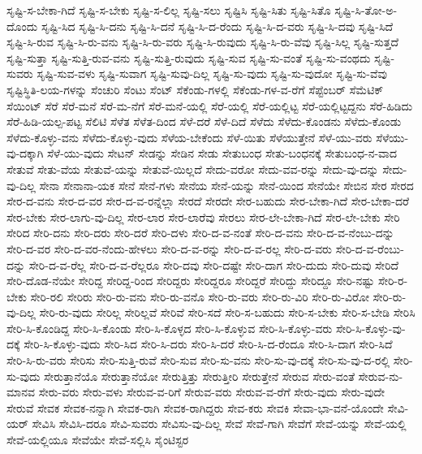 {ಸೃಷ್ಟಿ-ಸ-ಬೇಕಾ-ಗಿದೆ
ಸೃಷ್ಟಿ-ಸ-ಬೇಕು
ಸೃಷ್ಟಿ-ಸ-ಲಿಲ್ಲ
ಸೃಷ್ಟಿ-ಸಲು
ಸೃಷ್ಟಿಸಿ
ಸೃಷ್ಟಿ-ಸಿತು
ಸೃಷ್ಟಿ-ಸಿತೊ
ಸೃಷ್ಟಿ-ಸಿ-ತೋ-ಅ-ದೊಂದು
ಸೃಷ್ಟಿ-ಸಿದ
ಸೃಷ್ಟಿ-ಸಿ-ದನು
ಸೃಷ್ಟಿ-ಸಿ-ದನೆ
ಸೃಷ್ಟಿ-ಸಿ-ದ-ರೆಂದು
ಸೃಷ್ಟಿ-ಸಿ-ದ-ವರು
ಸೃಷ್ಟಿ-ಸಿ-ದವು
ಸೃಷ್ಟಿ-ಸಿದೆ
ಸೃಷ್ಟಿ-ಸಿ-ರುವ
ಸೃಷ್ಟಿ-ಸಿ-ರು-ವನು
ಸೃಷ್ಟಿ-ಸಿ-ರು-ವರು
ಸೃಷ್ಟಿ-ಸಿ-ರುವುದು
ಸೃಷ್ಟಿ-ಸಿ-ರು-ವೆವು
ಸೃಷ್ಟಿ-ಸಿಲ್ಲ
ಸೃಷ್ಟಿ-ಸುತ್ತದೆ
ಸೃಷ್ಟಿ-ಸುತ್ತಾ
ಸೃಷ್ಟಿ-ಸುತ್ತಿ-ರುವ-ವನು
ಸೃಷ್ಟಿ-ಸುತ್ತಿ-ರುವುದು
ಸೃಷ್ಟಿ-ಸುವ
ಸೃಷ್ಟಿ-ಸು-ವಂತೆ
ಸೃಷ್ಟಿ-ಸು-ವಂಥದು
ಸೃಷ್ಟಿ-ಸುವರು
ಸೃಷ್ಟಿ-ಸುವ-ವಳು
ಸೃಷ್ಟಿ-ಸುವಾಗ
ಸೃಷ್ಟಿ-ಸುವು-ದಿಲ್ಲ
ಸೃಷ್ಟಿ-ಸು-ವುದು
ಸೃಷ್ಟಿ-ಸು-ವುದೋ
ಸೃಷ್ಟಿ-ಸು-ವೆವು
ಸೃಷ್ಟಿಸ್ಥಿತಿ-ಲಯ-ಗಳನ್ನು
ಸೆಂಚುರಿ
ಸೆಂಟು
ಸೆಂಟ್
ಸೆಕೆಂಡು-ಗಳಲ್ಲಿ
ಸೆಕೆಂಡು-ಗಳ-ವ-ರೆಗೆ
ಸೆಪ್ಟೆಂಬರ್
ಸೆಮೆಟಿಕ್
ಸೆಯಿಂಟ್
ಸೆರೆ
ಸೆರೆ-ಮನೆ
ಸೆರೆ-ಮ-ನೆಗೆ
ಸೆರೆ-ಮನೆ-ಯಲ್ಲಿ
ಸೆರೆ-ಯಲ್ಲಿ
ಸೆರೆ-ಯಲ್ಲಿಟ್ಟ
ಸೆರೆ-ಯಲ್ಲಿಟ್ಟದ್ದನು
ಸೆರೆ-ಹಿಡಿದು
ಸೆರೆ-ಹಿಡಿ-ಯಲ್ಪ-ಪಟ್ಟ
ಸೆಲಿಟಿ
ಸೆಳೆತ
ಸೆಳೆತ-ದಿಂದ
ಸೆಳೆ-ದರೆ
ಸೆಳೆ-ದಿದೆ
ಸೆಳೆದು
ಸೆಳೆದು-ಕೊಂಡನು
ಸೆಳೆದು-ಕೊಂಡು
ಸೆಳೆದು-ಕೊಳ್ಳು-ವನು
ಸೆಳೆದು-ಕೊಳ್ಳು-ವುದು
ಸೆಳೆಯ-ಬೇಕೆಂದು
ಸೆಳೆ-ಯಿತು
ಸೆಳೆಯುತ್ತೇನೆ
ಸೆಳೆ-ಯು-ವರು
ಸೆಳೆಯು-ವು-ದಕ್ಕಾಗಿ
ಸೆಳೆ-ಯು-ವುದು
ಸೇಟನ್
ಸೇಡನ್ನು
ಸೇಡಿನ
ಸೇಡು
ಸೇತುಬಂಧ
ಸೇತು-ಬಂಧನಕ್ಕೆ
ಸೇತುಬಂಧ-ನ-ವಾದ
ಸೇತುವೆ
ಸೇತು-ವೆಯ
ಸೇತುವೆ-ಯನ್ನು
ಸೇತುವೆ-ಯಿಲ್ಲದೆ
ಸೇದು-ವರೋ
ಸೇದು-ವವ-ರನ್ನು
ಸೇದು-ವು-ದನ್ನು
ಸೇದು-ವು-ದಿಲ್ಲ
ಸೇನಾ
ಸೇನಾನಾ-ಯಕ
ಸೇನೆ
ಸೇನೆ-ಗಳು
ಸೇನೆಯ
ಸೇನೆ-ಯನ್ನು
ಸೇನೆ-ಯಿಂದ
ಸೇನೆಯೇ
ಸೇಬಿನ
ಸೇರ
ಸೇರದ
ಸೇರ-ದ-ವನು
ಸೇರ-ದ-ವರ
ಸೇರ-ದ-ವ-ರನ್ನೆಲ್ಲಾ
ಸೇರದೆ
ಸೇರದೇ
ಸೇರ-ಬಹುದು
ಸೇರ-ಬೇಕಾ-ಗಿದೆ
ಸೇರ-ಬೇಕಾ-ದರೆ
ಸೇರ-ಬೇಕು
ಸೇರ-ಲಾಗು-ವು-ದಿಲ್ಲ
ಸೇರ-ಲಾರ
ಸೇರ-ಲಾರೆವು
ಸೇರಲು
ಸೇರ-ಲೇ-ಬೇಕಾ-ಗಿದೆ
ಸೇರ-ಲೇ-ಬೇಕು
ಸೇರಿ
ಸೇರಿದ
ಸೇರಿ-ದನು
ಸೇರಿ-ದರು
ಸೇರಿ-ದರೆ
ಸೇರಿ-ದಳು
ಸೇರಿ-ದ-ವ-ನಂತೆ
ಸೇರಿ-ದ-ವನು
ಸೇರಿ-ದ-ವ-ನೆಂಬು-ದನ್ನು
ಸೇರಿ-ದ-ವರ
ಸೇರಿ-ದ-ವರ-ನೆಂದು-ಹೇಳಲು
ಸೇರಿ-ದ-ವ-ರನ್ನು
ಸೇರಿ-ದ-ವ-ರಲ್ಲ
ಸೇರಿ-ದ-ವರು
ಸೇರಿ-ದ-ವ-ರೆಂಬು-ದನ್ನು
ಸೇರಿ-ದ-ವ-ರೆಲ್ಲ
ಸೇರಿ-ದ-ವ-ರೆಲ್ಲರೂ
ಸೇರಿ-ದವು
ಸೇರಿ-ದಷ್ಟೇ
ಸೇರಿ-ದಾಗ
ಸೇರಿ-ದುದು
ಸೇರಿ-ದುವು
ಸೇರಿದೆ
ಸೇರಿ-ದೊಡ-ನೆಯೇ
ಸೇರಿದ್ದ
ಸೇರಿದ್ದ-ರಿಂದ
ಸೇರಿದ್ದರು
ಸೇರಿದ್ದರೂ
ಸೇರಿದ್ದರೆ
ಸೇರಿದ್ದು
ಸೇರಿದ್ದೂ
ಸೇರಿ-ನಷ್ಟು
ಸೇರಿ-ರ-ಬೇಕು
ಸೇರಿ-ರಲಿ
ಸೇರಿರು
ಸೇರಿ-ರು-ವನು
ಸೇರಿ-ರು-ವನೊ
ಸೇರಿ-ರು-ವರು
ಸೇರಿ-ರು-ವಿರಿ
ಸೇರಿ-ರು-ವಿರೋ
ಸೇರಿ-ರು-ವು-ದಿಲ್ಲ
ಸೇರಿ-ರು-ವುದು
ಸೇರಿಲ್ಲ
ಸೇರಿಲ್ಲವೆ
ಸೇರಿವೆ
ಸೇರಿ-ಸದೆ
ಸೇರಿ-ಸ-ಬಹುದು
ಸೇರಿ-ಸ-ಬೇಕು
ಸೇರಿ-ಸ-ಬೇಡಿ
ಸೇರಿಸಿ
ಸೇರಿ-ಸಿ-ಕೊಂಡಿದ್ದ
ಸೇರಿ-ಸಿ-ಕೊಂಡು
ಸೇರಿ-ಸಿ-ಕೊಳ್ಳದ
ಸೇರಿ-ಸಿ-ಕೊಳ್ಳುವ
ಸೇರಿ-ಸಿ-ಕೊಳ್ಳು-ವರು
ಸೇರಿ-ಸಿ-ಕೊಳ್ಳು-ವು-ದಕ್ಕೆ
ಸೇರಿ-ಸಿ-ಕೊಳ್ಳು-ವುದು
ಸೇರಿ-ಸಿದ
ಸೇರಿ-ಸಿ-ದರು
ಸೇರಿ-ಸಿ-ದರೆ
ಸೇರಿ-ಸಿ-ದ-ರೆಂದೂ
ಸೇರಿ-ಸಿ-ದಾಗ
ಸೇರಿ-ಸಿದೆ
ಸೇರಿ-ಸಿ-ರು-ವರು
ಸೇರಿಸು
ಸೇರಿ-ಸುತ್ತಿ-ರುವೆ
ಸೇರಿ-ಸುವ
ಸೇರಿ-ಸು-ವನು
ಸೇರಿ-ಸು-ವು-ದಕ್ಕೆ
ಸೇರಿ-ಸು-ವು-ದ-ರಲ್ಲಿ
ಸೇರಿ-ಸು-ವುದು
ಸೇರುತ್ತಾನೆಯೊ
ಸೇರುತ್ತಾನೆಯೋ
ಸೇರುತ್ತಿತ್ತು
ಸೇರುತ್ತೀರಿ
ಸೇರುತ್ತೇನೆ
ಸೇರುವ
ಸೇರು-ವಂತೆ
ಸೇರುವ-ನು-ಮಾನವ
ಸೇರು-ವರು
ಸೇರು-ವಳು
ಸೇರುವ-ವ-ರಿಗೆ
ಸೇರುವ-ವರು
ಸೇರುವ-ವ-ರೆಗೆ
ಸೇರು-ವುದು
ಸೇರು-ವುದೇ
ಸೇರುವೆ
ಸೇವಕ
ಸೇವಕ-ನನ್ನಾಗಿ
ಸೇವಕ-ರಾಗಿ
ಸೇವಕ-ರಾಗಿದ್ದರು
ಸೇವ-ಕರು
ಸೇವಕಿ
ಸೇವಾ-ಭಾ-ವನೆ-ಯೊಂದೇ
ಸೇವಿ-ಯರ್
ಸೇವಿಸಿ
ಸೇವಿಸಿ-ದರೂ
ಸೇವಿ-ಸುವರು
ಸೇವಿಸು-ವು-ದಿಲ್ಲ
ಸೇವೆ
ಸೇವೆ-ಗಾಗಿ
ಸೇವೆಗೆ
ಸೇವೆ-ಯನ್ನು
ಸೇವೆ-ಯಲ್ಲಿ
ಸೇವೆ-ಯಲ್ಲಿಯೂ
ಸೇವೆಯೇ
ಸೇವೆ-ಸಲ್ಲಿಸಿ
ಸೈಂಟಿಸ್ಟರ
}
